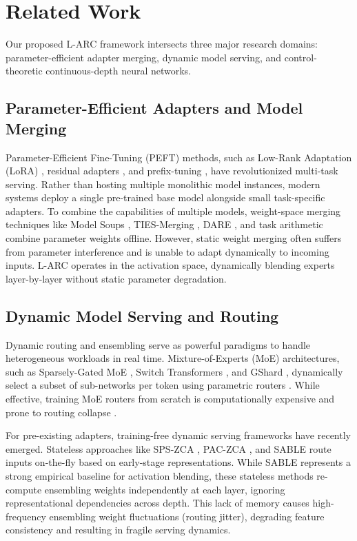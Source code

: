 \section{Related Work}
\label{sec:related_work}

Our proposed L-ARC framework intersects three major research domains: parameter-efficient adapter merging, dynamic model serving, and control-theoretic continuous-depth neural networks.

\subsection{Parameter-Efficient Adapters and Model Merging}
Parameter-Efficient Fine-Tuning (PEFT) methods, such as Low-Rank Adaptation (LoRA) \cite{hu2021lora}, residual adapters \cite{houlsby2019parameter, rebuffi2017learning}, and prefix-tuning \cite{li2021prefix}, have revolutionized multi-task serving. Rather than hosting multiple monolithic model instances, modern systems deploy a single pre-trained base model alongside small task-specific adapters. 
To combine the capabilities of multiple models, weight-space merging techniques like Model Soups \cite{wortsman2022model}, TIES-Merging \cite{yadav2023ties}, DARE \cite{jin2023collaborative}, and task arithmetic \cite{ilharco2022editing, ortiz2023task} combine parameter weights offline. However, static weight merging often suffers from parameter interference and is unable to adapt dynamically to incoming inputs. L-ARC operates in the activation space, dynamically blending experts layer-by-layer without static parameter degradation.

\subsection{Dynamic Model Serving and Routing}
Dynamic routing and ensembling serve as powerful paradigms to handle heterogeneous workloads in real time. Mixture-of-Experts (MoE) architectures, such as Sparsely-Gated MoE \cite{shazeer2017outrageously}, Switch Transformers \cite{fedus2022switch}, and GShard \cite{lepikhin2020gshard}, dynamically select a subset of sub-networks per token using parametric routers \cite{zhou2022mixture, rosenbaum2017routing}. While effective, training MoE routers from scratch is computationally expensive and prone to routing collapse \cite{zoph2022st}.

For pre-existing adapters, training-free dynamic serving frameworks have recently emerged. Stateless approaches like SPS-ZCA \cite{spszca2025}, PAC-ZCA \cite{paczca2025}, and SABLE \cite{sable2025} route inputs on-the-fly based on early-stage representations. While SABLE represents a strong empirical baseline for activation blending, these stateless methods re-compute ensembling weights independently at each layer, ignoring representational dependencies across depth. This lack of memory causes high-frequency ensembling weight fluctuations (routing jitter), degrading feature consistency and resulting in fragile serving dynamics.

